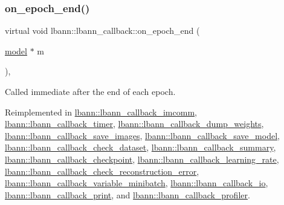 \subsubsection{\texorpdfstring{on\+\_\+epoch\+\_\+end()}{on\_epoch\_end()}}
{\footnotesize\ttfamily virtual void lbann\+::lbann\+\_\+callback\+::on\+\_\+epoch\+\_\+end (\begin{DoxyParamCaption}\item[{\hyperlink{classlbann_1_1model}{model} $\ast$}]{m }\end{DoxyParamCaption})\hspace{0.3cm}{\ttfamily [inline]}, {\ttfamily [virtual]}}

Called immediate after the end of each epoch. 

Reimplemented in \hyperlink{classlbann_1_1lbann__callback__imcomm_a3160dbf536def4f930e0ea0aabdebc11}{lbann\+::lbann\+\_\+callback\+\_\+imcomm}, \hyperlink{classlbann_1_1lbann__callback__timer_a95ccee037894dbb5e3c663fbdfbc9d7f}{lbann\+::lbann\+\_\+callback\+\_\+timer}, \hyperlink{classlbann_1_1lbann__callback__dump__weights_aa73068d94b2408fc0124b2a05b4e2b8a}{lbann\+::lbann\+\_\+callback\+\_\+dump\+\_\+weights}, \hyperlink{classlbann_1_1lbann__callback__save__images_aa540916eef9b95db68889a8a7426779c}{lbann\+::lbann\+\_\+callback\+\_\+save\+\_\+images}, \hyperlink{classlbann_1_1lbann__callback__save__model_ae047ee35b65e9bda4080a83833612699}{lbann\+::lbann\+\_\+callback\+\_\+save\+\_\+model}, \hyperlink{classlbann_1_1lbann__callback__check__dataset_a8cbc105d8bd9d3b493ef34de7c387929}{lbann\+::lbann\+\_\+callback\+\_\+check\+\_\+dataset}, \hyperlink{classlbann_1_1lbann__callback__summary_a404e64dcedfcba611510379f99dcace9}{lbann\+::lbann\+\_\+callback\+\_\+summary}, \hyperlink{classlbann_1_1lbann__callback__checkpoint_a406bfba673e503e94ae6eb57aff6a78e}{lbann\+::lbann\+\_\+callback\+\_\+checkpoint}, \hyperlink{classlbann_1_1lbann__callback__learning__rate_ab8eb509bdbea501882d6b248a814bb28}{lbann\+::lbann\+\_\+callback\+\_\+learning\+\_\+rate}, \hyperlink{classlbann_1_1lbann__callback__check__reconstruction__error_a8a6a72b8016d3ba3ad11b5e7e2f3f5df}{lbann\+::lbann\+\_\+callback\+\_\+check\+\_\+reconstruction\+\_\+error}, \hyperlink{classlbann_1_1lbann__callback__variable__minibatch_a091e7563b5a7a90638e2521fe39cbf8f}{lbann\+::lbann\+\_\+callback\+\_\+variable\+\_\+minibatch}, \hyperlink{classlbann_1_1lbann__callback__io_a118c5cb8a9c83661a67569df890676e2}{lbann\+::lbann\+\_\+callback\+\_\+io}, \hyperlink{classlbann_1_1lbann__callback__print_a28f2b022193c62f3af40364d2c5b14b2}{lbann\+::lbann\+\_\+callback\+\_\+print}, and \hyperlink{classlbann_1_1lbann__callback__profiler_a86e0fbe550ff42660766977604d9d5a6}{lbann\+::lbann\+\_\+callback\+\_\+profiler}.



